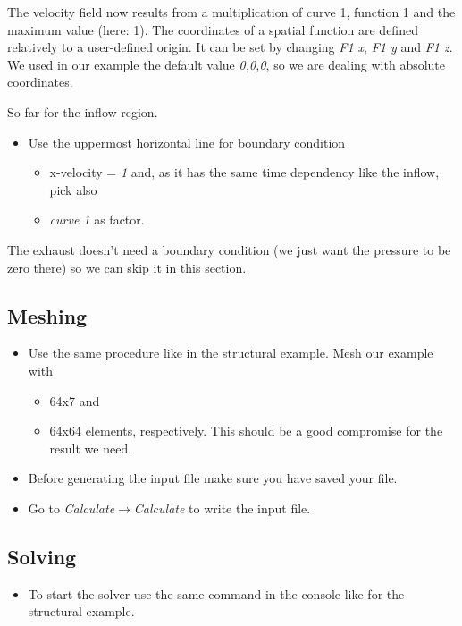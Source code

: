 The velocity field now results from a multiplication of curve 1, function
1 and the maximum value (here: 1). The coordinates of a spatial function are defined relatively to a user-defined origin. It can be set by changing \emph{F1 x}, \emph{F1 y} and  \emph{F1 z}. We used in our example the default value \emph{0,0,0}, so we are dealing with absolute coordinates.

So far for the inflow region.

\begin{itemize}
\item Use the uppermost horizontal line for boundary condition 

\begin{itemize}
\item x-velocity = \emph{1} and, as it has the same time dependency like
the inflow, pick also 
\item \emph{curve 1} as factor.
\end{itemize}
\end{itemize}
The exhaust doesn't need a boundary condition (we just want the pressure
to be zero there) so we can skip it in this section. 


\subsection{Meshing}

\begin{itemize}
\item Use the same procedure like in the structural example. Mesh our example
with 

\begin{itemize}
\item 64x7 and 
\item 64x64 elements, respectively. This should be a good compromise for
the result we need.
\end{itemize}
\item Before generating the input file make sure you have saved your file.
\item Go to \emph{Calculate$\to$Calculate} to write the input file.
\end{itemize}

\subsection{Solving}

\begin{itemize}
\item To start the solver use the same command in the console like for the
structural example.
\end{itemize}


